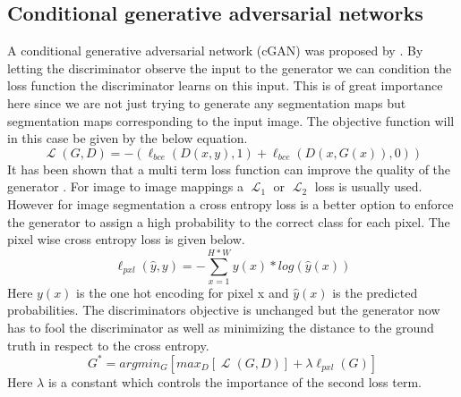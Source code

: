 \documentclass{kththesis}
\DeclareMathOperator{\Lagr}{\mathcal{L}}
\begin{document}
\subsection{Conditional generative adversarial networks}
A conditional generative adversarial network (cGAN) was proposed by \parencite{mirza_conditional_2014}.
By letting the discriminator observe the input to the generator we can condition the loss function the discriminator learns on this input. This is of great importance here since we are not just trying to generate any segmentation maps but segmentation maps corresponding to the input image. The objective function will in this case be given by the below equation.
\begin{equation}
\Lagr(G, D) =  -(\ell_{bce}(D(x, y), 1) + \ell_{bce}(D(x, G(x)), 0))\label{eq:cgan}
\end{equation}
It has been shown that a multi term loss function can improve the quality of the generator \parencite{pathak_context_2016, isola_image--image_2016}. For image to image mappings a $\Lagr_1$ or $\Lagr_2$ loss is usually used. However for image segmentation a cross entropy loss is a better option to enforce the generator to assign a high probability to the correct class for each pixel. The pixel wise cross entropy loss is given below.
\begin{equation}\label{eq:mce}
\ell_{pxl}(\hat{y}, y) = - \sum_{x=1}^{H*W}y(x)*log(\hat{y}(x))
\end{equation}
Here $y(x)$ is the one hot encoding for pixel x and $\hat{y}(x)$ is the predicted probabilities. The discriminators objective is unchanged but the generator now has to fool the discriminator as well as minimizing the distance to the ground truth in respect to the cross entropy.
\begin{equation}
G^{*}=argmin_{G}[max_{D}[\Lagr(G, D)] + \lambda \ell_{pxl}(G)]
\end{equation}
Here $\lambda$ is a constant which controls the importance of the second  loss term.
\end{document}
